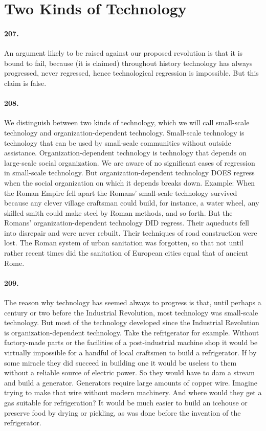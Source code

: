 \documentclass[12pt]{book}
\newcommand{\mysection}[1]{\section*{#1} \addcontentsline{toc}{section}{#1}}
\begin{document}
\mysection{Two Kinds of Technology}


\paragraph{207.} An argument likely to be raised against our proposed revolution is that it is bound to fail, because (it is claimed) throughout history technology has always progressed, never regressed, hence technological regression is impossible. But this claim is false.


\paragraph{208.} We distinguish between two kinds of technology, which we will call small-scale technology and organization-dependent technology. Small-scale technology is technology that can be used by small-scale communities without outside assistance. Organization-dependent technology is technology that depends on large-scale social organization. We are aware of no significant cases of regression in small-scale technology. But organization-dependent technology DOES regress when the social organization on which it depends breaks down. Example: When the Roman Empire fell apart the Romans' small-scale technology survived because any clever village craftsman could build, for instance, a water wheel, any skilled smith could make steel by Roman methods, and so forth. But the Romans' organization-dependent technology DID regress. Their aqueducts fell into disrepair and were never rebuilt. Their techniques of road construction were lost. The Roman system of urban sanitation was forgotten, so that not until rather recent times did the sanitation of European cities equal that of ancient Rome.


\paragraph{209.}  The reason why technology has seemed always to progress is that, until perhaps a century or two before the Industrial Revolution, most technology was small-scale technology. But most of the technology developed since the Industrial Revolution is organization-dependent technology. Take the refrigerator for example. Without factory-made parts or the facilities of a post-industrial machine shop it would be virtually impossible for a handful of local craftsmen to build a refrigerator. If by some miracle they did succeed in building one it would be useless to them without a reliable source of electric power. So they would have to dam a stream and build a generator. Generators require large amounts of copper wire. Imagine trying to make that wire without modern machinery. And where would they get a gas suitable for refrigeration? It would be much easier to build an icehouse or preserve food by drying or pickling, as was done before the invention of the refrigerator.
\end{document}
